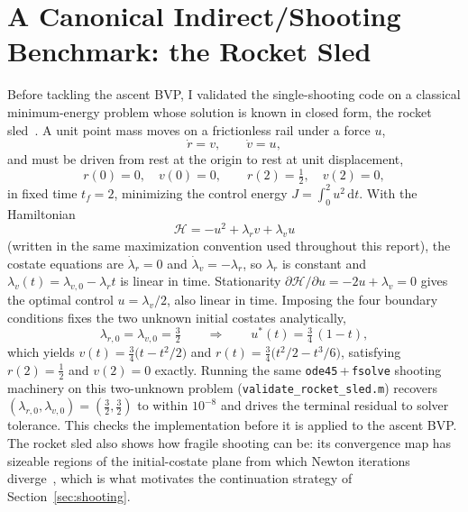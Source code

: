 \documentclass[../main.tex]{subfiles}
\begin{document}
\section{A Canonical Indirect/Shooting Benchmark: the Rocket Sled}\label{sec:appendix_sled}

Before tackling the ascent BVP, I validated the single-shooting code on a classical minimum-energy problem whose solution is known in closed form, the rocket sled~\cite[Lecture~5]{dclvnotes}. A unit point mass moves on a frictionless rail under a force $u$,
\begin{equation}
    \dot{r} = v, \qquad \dot{v} = u,
\end{equation}
and must be driven from rest at the origin to rest at unit displacement,
\begin{equation}
    r(0) = 0,\quad v(0) = 0, \qquad r(2) = \tfrac{1}{2},\quad v(2) = 0,
\end{equation}
in fixed time $t_f = 2$, minimizing the control energy $J = \int_0^{2} u^2\,\mathrm{d}t$. With the Hamiltonian
\begin{equation}
    \mathcal{H} = -u^2 + \lambda_r v + \lambda_v u
\end{equation}
(written in the same maximization convention used throughout this report), the costate equations are $\dot{\lambda}_r = 0$ and $\dot{\lambda}_v = -\lambda_r$, so $\lambda_r$ is constant and $\lambda_v(t) = \lambda_{v,0} - \lambda_r t$ is linear in time. Stationarity $\partial\mathcal{H}/\partial u = -2u + \lambda_v = 0$ gives the optimal control $u = \lambda_v/2$, also linear in time. Imposing the four boundary conditions fixes the two unknown initial costates analytically,
\begin{equation}
    \lambda_{r,0} = \lambda_{v,0} = \tfrac{3}{2}
    \qquad\Longrightarrow\qquad
    u^*(t) = \tfrac{3}{4}\,(1 - t),
\end{equation}
which yields $v(t) = \tfrac{3}{4}\bigl(t - t^2/2\bigr)$ and $r(t) = \tfrac{3}{4}\bigl(t^2/2 - t^3/6\bigr)$, satisfying $r(2) = \tfrac{1}{2}$ and $v(2) = 0$ exactly. Running the same \texttt{ode45}\,+\,\texttt{fsolve} shooting machinery on this two-unknown problem (\texttt{validate\_rocket\_sled.m}) recovers $(\lambda_{r,0}, \lambda_{v,0}) = (\tfrac{3}{2}, \tfrac{3}{2})$ to within $10^{-8}$ and drives the terminal residual to solver tolerance. This checks the implementation before it is applied to the ascent BVP. The rocket sled also shows how fragile shooting can be: its convergence map has sizeable regions of the initial-costate plane from which Newton iterations diverge~\cite[Lecture~5]{dclvnotes}, which is what motivates the continuation strategy of Section~\ref{sec:shooting}.
\end{document}

